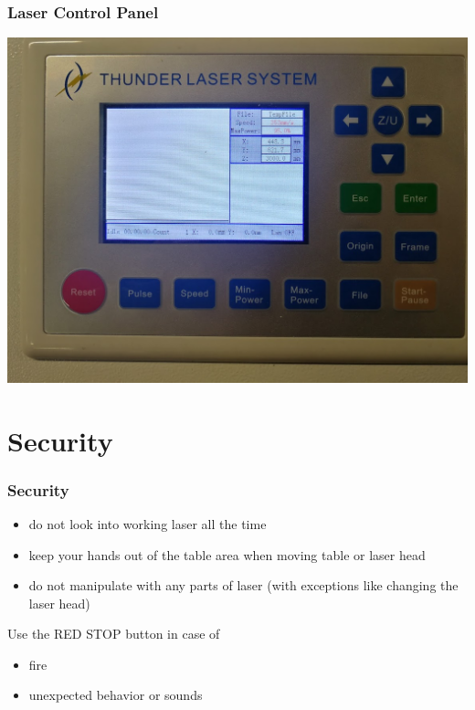 \documentclass[14pt]{beamer}
\begin{document}
\begin{frame}
\frametitle{Laser Control Panel}

\centering
\includegraphics[scale=0.2]{imgs/laser_cp.jpg}

\end{frame}


\section{Security}
\begin{frame}
\frametitle{Security}

\begin{itemize}
	\item do not look into working laser all the time
	\item keep your hands out of the table area when moving table or laser head
	\item do not manipulate with any parts of laser (with exceptions like changing the laser head)
\end{itemize}

\begin{alertblock}{Use the RED STOP button in case of}
	\begin{itemize}
		\item fire
		\item unexpected behavior or sounds
	\end{itemize}
\end{alertblock}

\end{frame}
\end{document}
